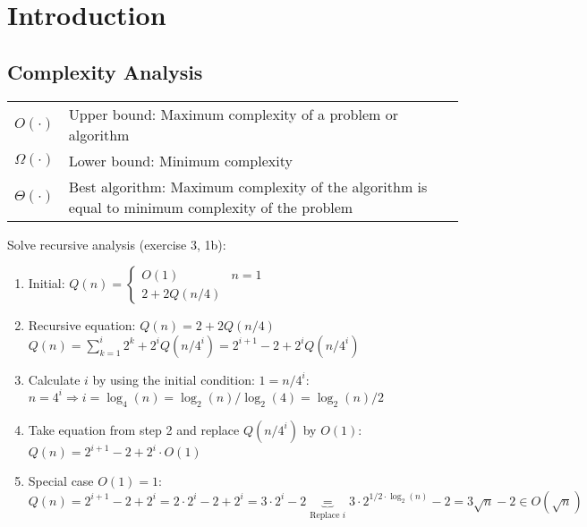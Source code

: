 \section{Introduction}
\subsection{Complexity Analysis}
  \begin{tabular}{ll}
    $O(\cdot)$ & Upper bound: Maximum complexity of a problem or algorithm \\
    $\Omega(\cdot)$ & Lower bound: Minimum complexity\\
    $\Theta(\cdot)$ & Best algorithm: Maximum complexity of the algorithm is equal to minimum complexity of the problem
  \end{tabular}
  
  Solve recursive analysis (exercise 3, 1b):
  \begin{enumerate}
    \item Initial: $Q(n) = \begin{cases}O(1) & n=1\\2+2Q(n/4)\end{cases}$
    \item Recursive equation: $Q(n) = 2+2 Q(n/4)$\\$Q(n) = \sum\limits_{k=1}^i 2^k + 2^i Q(n/4^i) = 2^{i+1}-2 + 2^i Q(n/4^i)$
    \item Calculate $i$ by using the initial condition: $1 = n/4^i$:\\
    $n=4^i  \Rightarrow i = \log_4(n) = \log_2(n) / \log_2(4) = \log_2(n) / 2$
    \item Take equation from step 2 and replace $Q(n/4^i)$ by $O(1)$:\\
    $Q(n) = 2^{i+1} - 2 + 2^i \cdot O(1)$ 
    \item Special case $O(1) = 1$:\\
    $Q(n) = 2^{i+1} - 2 + 2^i = 2 \cdot 2^i - 2 + 2^i = 3 \cdot 2^i -2 
    \underbrace{=}_{\text{Replace }i} 3 \cdot 2^{1/2 \cdot \log_2(n)} - 2 = 3 \sqrt{n} - 2 \in O(\sqrt{n})$
  \end{enumerate}